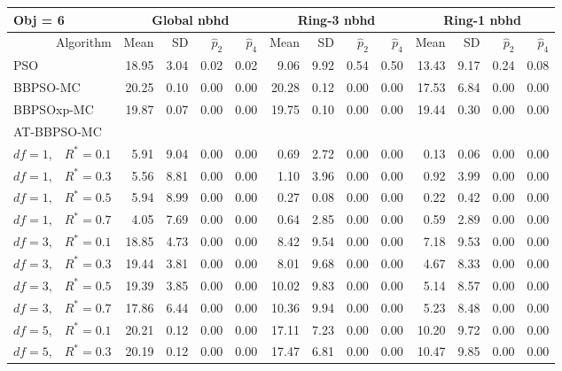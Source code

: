 \documentclass[12pt]{article}
\begin{document}
\begin{table}[ht]
\centering
\footnotesize{
\begin{tabular}{r|rrrr|rrrr|rrrr}
\multicolumn{1}{l}{Obj = 6} & \multicolumn{4}{c}{Global nbhd} & \multicolumn{4}{c}{Ring-3 nbhd} & \multicolumn{4}{c}{Ring-1 nbhd}\\
  \hline
Algorithm & Mean & SD & $\widehat{p}_2$ & $\widehat{p}_4$ & Mean & SD & $\widehat{p}_2$ & $\widehat{p}_4$ & Mean & SD & $\widehat{p}_2$ & $\widehat{p}_4$ \\ 
  \hline
\multicolumn{1}{l|}{PSO} & 18.95 & 3.04 & 0.02 & 0.02 & 9.06 & 9.92 & 0.54 & 0.50 & 13.43 & 9.17 & 0.24 & 0.08 \\ 
  \multicolumn{1}{l|}{BBPSO-MC} & 20.25 & 0.10 & 0.00 & 0.00 & 20.28 & 0.12 & 0.00 & 0.00 & 17.53 & 6.84 & 0.00 & 0.00 \\ 
  \multicolumn{1}{l|}{BBPSOxp-MC} & 19.87 & 0.07 & 0.00 & 0.00 & 19.75 & 0.10 & 0.00 & 0.00 & 19.44 & 0.30 & 0.00 & 0.00 \\ 
\hline
\multicolumn{1}{l|}{AT-BBPSO-MC} &&&&&&&&&&&&\\
  $df = 1,\enspace$ $R^* =0.1$ & 5.91 & 9.04 & 0.00 & 0.00 & 0.69 & 2.72 & 0.00 & 0.00 & 0.13 & 0.06 & 0.00 & 0.00 \\ 
  $df = 1,\enspace$ $R^* =0.3$ & 5.56 & 8.81 & 0.00 & 0.00 & 1.10 & 3.96 & 0.00 & 0.00 & 0.92 & 3.99 & 0.00 & 0.00 \\ 
  $df = 1,\enspace$ $R^* =0.5$ & 5.94 & 8.99 & 0.00 & 0.00 & 0.27 & 0.08 & 0.00 & 0.00 & 0.22 & 0.42 & 0.00 & 0.00 \\ 
  $df = 1,\enspace$ $R^* =0.7$ & 4.05 & 7.69 & 0.00 & 0.00 & 0.64 & 2.85 & 0.00 & 0.00 & 0.59 & 2.89 & 0.00 & 0.00 \\ 
  $df = 3,\enspace$ $R^* =0.1$ & 18.85 & 4.73 & 0.00 & 0.00 & 8.42 & 9.54 & 0.00 & 0.00 & 7.18 & 9.53 & 0.00 & 0.00 \\ 
  $df = 3,\enspace$ $R^* =0.3$ & 19.44 & 3.81 & 0.00 & 0.00 & 8.01 & 9.68 & 0.00 & 0.00 & 4.67 & 8.33 & 0.00 & 0.00 \\ 
  $df = 3,\enspace$ $R^* =0.5$ & 19.39 & 3.85 & 0.00 & 0.00 & 10.02 & 9.83 & 0.00 & 0.00 & 5.14 & 8.57 & 0.00 & 0.00 \\ 
  $df = 3,\enspace$ $R^* =0.7$ & 17.86 & 6.44 & 0.00 & 0.00 & 10.36 & 9.94 & 0.00 & 0.00 & 5.23 & 8.48 & 0.00 & 0.00 \\ 
  $df = 5,\enspace$ $R^* =0.1$ & 20.21 & 0.12 & 0.00 & 0.00 & 17.11 & 7.23 & 0.00 & 0.00 & 10.20 & 9.72 & 0.00 & 0.00 \\ 
  $df = 5,\enspace$ $R^* =0.3$ & 20.19 & 0.12 & 0.00 & 0.00 & 17.47 & 6.81 & 0.00 & 0.00 & 10.47 & 9.85 & 0.00 & 0.00 \\ 

\end{tabular}}
\end{table}
\end{document}
